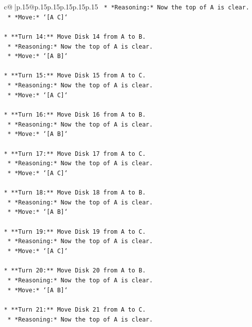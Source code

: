 \documentclass{article}
\begin{document}
{\begin{supertabular}{c@{$\;$}|p{.15\linewidth}@{}p{.15\linewidth}p{.15\linewidth}p{.15\linewidth}p{.15\linewidth}p{.15\linewidth}}
{{{\texttt{    *   *Reasoning:* Now the top of A is clear.} \\
\texttt{    *   *Move:* `{[}A C{]}`} \\
\\ 
\texttt{*   **Turn 14:** Move Disk 14 from A to B.} \\
\texttt{    *   *Reasoning:* Now the top of A is clear.} \\
\texttt{    *   *Move:* `{[}A B{]}`} \\
\\ 
\texttt{*   **Turn 15:** Move Disk 15 from A to C.} \\
\texttt{    *   *Reasoning:* Now the top of A is clear.} \\
\texttt{    *   *Move:* `{[}A C{]}`} \\
\\ 
\texttt{*   **Turn 16:** Move Disk 16 from A to B.} \\
\texttt{    *   *Reasoning:* Now the top of A is clear.} \\
\texttt{    *   *Move:* `{[}A B{]}`} \\
\\ 
\texttt{*   **Turn 17:** Move Disk 17 from A to C.} \\
\texttt{    *   *Reasoning:* Now the top of A is clear.} \\
\texttt{    *   *Move:* `{[}A C{]}`} \\
\\ 
\texttt{*   **Turn 18:** Move Disk 18 from A to B.} \\
\texttt{    *   *Reasoning:* Now the top of A is clear.} \\
\texttt{    *   *Move:* `{[}A B{]}`} \\
\\ 
\texttt{*   **Turn 19:** Move Disk 19 from A to C.} \\
\texttt{    *   *Reasoning:* Now the top of A is clear.} \\
\texttt{    *   *Move:* `{[}A C{]}`} \\
\\ 
\texttt{*   **Turn 20:** Move Disk 20 from A to B.} \\
\texttt{    *   *Reasoning:* Now the top of A is clear.} \\
\texttt{    *   *Move:* `{[}A B{]}`} \\
\\ 
\texttt{*   **Turn 21:** Move Disk 21 from A to C.} \\
\texttt{    *   *Reasoning:* Now the top of A is clear.} \\
}}}
\end{supertabular}}
\end{document}
